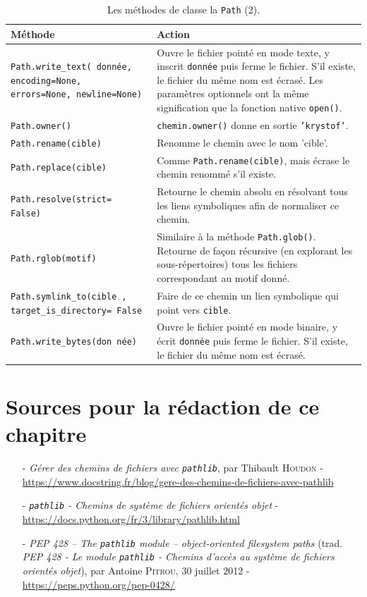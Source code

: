 \documentclass[a4paper,12pt]{book}
\begin{document}
\begin{table}[h]\label{pathlib_2}
\begin{center}
\begin{tabular}{|p{4cm}|p{10.5cm}|}
\hline
\textbf{Méthode} & \textbf{Action} \\
\hline
\texttt{Path.write\_text(
donnée, encoding=None, errors=None, newline=None)} & Ouvre le fichier pointé en mode texte, y inscrit \texttt{donnée} puis ferme le fichier. S'il existe, le fichier du même nom est écrasé. Les paramètres optionnels ont la même signification que la fonction native \texttt{open()}. \\
\hline
\texttt{Path.owner()} & \texttt{chemin.owner()} donne en sortie \texttt{'krystof'}. \\
\hline
\texttt{Path.rename(cible)} & Renomme le chemin avec le nom 'cible'. \\
\hline
\texttt{Path.replace(cible)} & Comme \texttt{Path.rename(cible)}, mais écrase le chemin renommé s'il existe. \\
\hline
\texttt{Path.resolve(strict=
False)} & Retourne le chemin absolu en résolvant tous les liens symboliques afin de normaliser ce chemin. \\
\hline
\texttt{Path.rglob(motif)} & Similaire à la méthode \texttt{Path.glob()}. Retourne de façon récursive (en explorant les sous-répertoires) tous les fichiers correspondant au motif donné. \\
\hline
\texttt{Path.symlink\_to(cible
, target\_is\_directory=
False} & Faire de ce chemin un lien symbolique qui point vers \texttt{cible}. \\
\hline
\texttt{Path.write\_bytes(don
née)} & Ouvre le fichier pointé en mode binaire, y écrit \texttt{donnée} puis ferme le fichier. S'il existe, le fichier du même nom est écrasé. \\
\hline
\end{tabular}
\caption{Les méthodes de classe la  \texttt{Path} (2).}
\end{center}
\end{table}
\medskip

\section{Sources pour la rédaction de ce chapitre}
\begin{itemize}
	\item[-] \textit{Gérer des chemins de fichiers avec \texttt{pathlib}}, par Thibault \textsc{Houdon} - \url{https://www.docstring.fr/blog/gere-des-chemins-de-fichiers-avec-pathlib}
	\item[-] \textit{\texttt{pathlib} - Chemins de système de fichiers orientés objet} - \url{https://docs.python.org/fr/3/library/pathlib.html}
	\item[-] \textit{PEP 428 – The \texttt{pathlib} module – object-oriented filesystem paths} (trad. \textit{PEP 428 - Le module \texttt{pathlib} - Chemins d'accès au système de fichiers orientés objet}), par Antoine \textsc{Pitrou}, 30 juillet 2012 - \url{https://peps.python.org/pep-0428/}  
\end{itemize}
\medskip
\end{document}
